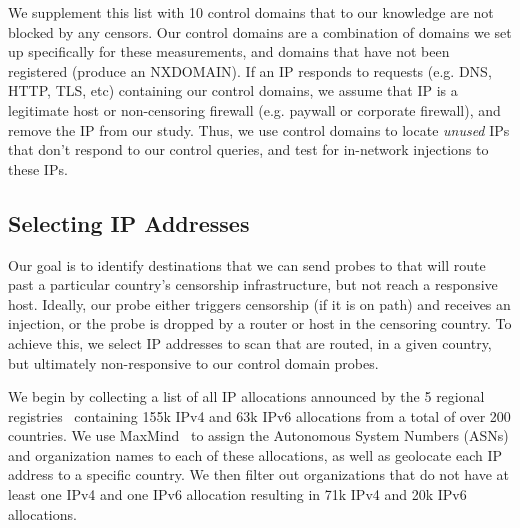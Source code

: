 We supplement this list with 10 control domains that to our knowledge are not
blocked by any censors. Our control domains are a combination of domains we set up
specifically for these measurements, and domains that have not been registered
(produce an NXDOMAIN).
If an IP responds to requests (e.g. DNS, HTTP,
TLS, etc) containing our control domains, we assume that IP is a legitimate host
or non-censoring firewall (e.g. paywall or corporate firewall), and remove the
IP from our study. Thus, we use control domains to locate \emph{unused} IPs that
don't respond to our control queries, and test for in-network injections to
these IPs.


\subsection{Selecting IP Addresses}
\label{subsec:selecting-ips}

\FigAllocSize

Our goal is to identify destinations that we can send probes to that will route
past a particular country's censorship infrastructure, but not reach a
responsive host. Ideally, our probe either triggers censorship (if it is on path) and
receives an injection, or the probe is dropped by a router or host in the censoring
country. To achieve this, we select IP addresses to scan that are routed, in a
given country, but ultimately
non-responsive to our control domain probes.

%

We begin by collecting a list of all IP allocations announced by the 5 regional
registries~\cite{herrbisc56:online} containing 155k IPv4 and
63k IPv6 allocations from a total of over 200 countries. We use
MaxMind~\cite{IPGeoloc87:online} to assign the Autonomous System Numbers (ASNs)
and organization names to each of these allocations, as well as geolocate each
IP address to a specific country. We then filter out
organizations that do not have at least one IPv4 and one IPv6 allocation
resulting in 71k IPv4 and 20k IPv6 allocations.

